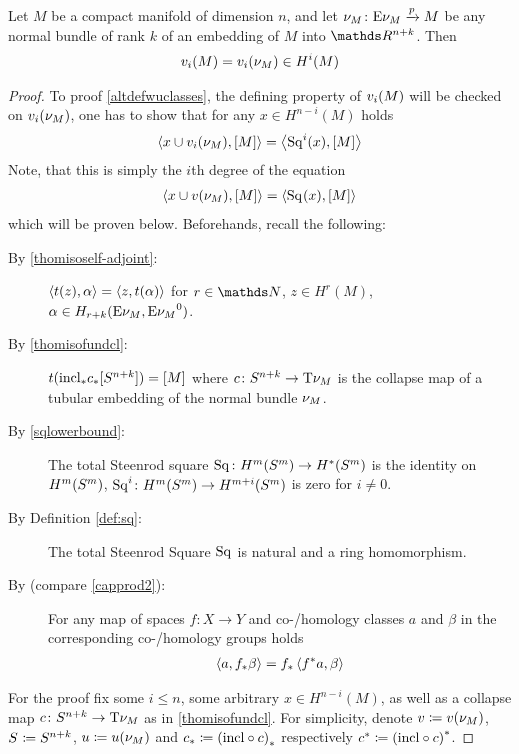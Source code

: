 \begin{Thm}\label{altdefwuclasses}
  Let $M$ be a compact manifold of dimension $n$, and let
  $\nu_{M}\colon \mathrm{E}\nu_{M} \xrightarrow{p} M$ be
  any normal bundle of rank $k$ of an embedding of $M$ into
  $\R^{n+k}$. Then
  \begin{gather*}
    v_i(M) = v_i(\nu_{M})\in H^i(M)
  \end{gather*}
  \begin{proof}
    To proof \ref{altdefwuclasses}, the defining property of
    $v_i(M)$ will be checked on $v_i(\nu_{M})$, \idest one has to show
    that for any $x\in H^{n-i}(M)$ holds
    \begin{gather*}
      \left\langle x\cup v_i(\nu_{M}), [M] \right\rangle
      = \left\langle \mathrm{Sq}^{i}(x), [M] \right\rangle
    \end{gather*}
    Note, that this is simply the $i$th degree of the equation
    \begin{gather}\label{proofaltdefwuclasses:claim}
      \left\langle x\cup v(\nu_{M}), [M] \right\rangle
      = \left\langle \mathrm{Sq}^{}(x), [M] \right\rangle
    \end{gather}
    which will be proven below.
    Beforehands, recall the following:
    \begin{description}
    \item[By \autoref{thomisoself-adjoint}:]
      $\left\langle t(z), \alpha \right\rangle = \left\langle z, t(\alpha) \right\rangle$
      for $r\in\Nat$, $z\in H^r(M)$,
      $\alpha\in H_{r+k}(\mathrm{E}\nu_{M}, {\mathrm{E}\nu_{M}}^0)$.
    \item[By \autoref{thomisofundcl}:]
      $t({\mathrm{incl}}_*{c}_*[S^{n+k}]) = [M]$
      where $c\colon S^{n+k}\to \mathrm{T}{\nu_{M}}$ is
      the collapse map of a tubular embedding of the normal bundle $\nu_{M}$.
    \item[By \autoref{sqlowerbound}:]
      The total Steenrod square
      $\mathrm{Sq}^{}\colon H^m(S^{m})
      \to H^*(S^{m})$
      is the identity on $H^m(S^{m})$, \idest
      $\mathrm{Sq}^{i}\colon H^m(S^{m})\to H^{m+i}(S^{m})$ is zero for
      $i\neq0$.
    \item[By Definition \autoref{def:sq}:] The total Steenrod Square
      $\mathrm{Sq}^{}$ is natural and a ring homomorphism.
    \item[By {\cite[Chap.~3.3.2, p.~241]{hatcher}}
      (compare \autoref{capprod2}):]
      For any map of spaces $f\colon X\to Y$ and co-/homology classes
      $a$ and $\beta$ in the corresponding co-/homology groups holds
      \begin{gather}\label{capprod2copy}
        \left\langle a, {f}_* \beta \right\rangle = {f}_* \left\langle {f}^* a, \beta \right\rangle
      \end{gather}
    \end{description}
    For the proof fix some $i\leq n$, some arbitrary $x\in
    H^{n-i}(M)$, as well as a collapse map
    $c\colon S^{n+k}\to\mathrm{T}{\nu_{M}}$ as in
    \autoref{thomisofundcl}.
    For simplicity, denote
    $v\coloneqq v(\nu_{M})$,
    $S^{}\coloneqq S^{n+k}$,
    $u\coloneqq u(\nu_{M})$ and
    ${c}_*\coloneqq {(\mathrm{incl}\circ c)}_*$
    respectively
    ${c}^*\coloneqq {(\mathrm{incl}\circ c)}^*$.
    

\end{proof}
\end{Thm}
